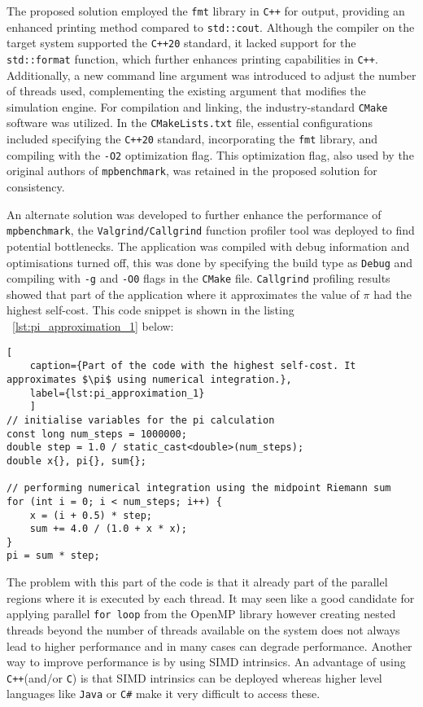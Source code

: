 The proposed solution employed the \texttt{fmt} library in \texttt{C++}\cite{fmt_printing_library} for output, providing an enhanced printing method compared to \texttt{std::cout}. Although the compiler on the target system supported the \texttt{C++20} standard, it lacked support for the \texttt{std::format} function, which further enhances printing capabilities in \texttt{C++}\cite{std_format_gcc_compiler_version}. Additionally, a new command line argument was introduced to adjust the number of threads used, complementing the existing argument that modifies the simulation engine. For compilation and linking, the industry-standard \texttt{CMake}\cite{cmake_about} software was utilized. In the \texttt{CMakeLists.txt} file, essential configurations included specifying the \texttt{C++20} standard, incorporating the \texttt{fmt} library, and compiling with the \texttt{-O2} optimization flag. This optimization flag, also used by the original authors of \texttt{mpbenchmark}\cite{mpbenchmark_paper}, was retained in the proposed solution for consistency.

An alternate solution was developed to further enhance the performance of \texttt{mpbenchmark}, the \texttt{Valgrind/Callgrind} function profiler tool was deployed to find potential bottlenecks. The application was compiled with debug information and optimisations turned off, this was done by specifying the build type as \texttt{Debug} and compiling with \texttt{-g} and \texttt{-O0} flags in the \texttt{CMake} file. \texttt{Callgrind} profiling results showed that part of the application where it approximates the value of $\pi$ had the highest self-cost. This code snippet is shown in the listing ~\ref{lst:pi_approximation_1} below:

\begin{lstlisting}[
	caption={Part of the code with the highest self-cost. It approximates $\pi$ using numerical integration.},
	label={lst:pi_approximation_1}
	]
// initialise variables for the pi calculation
const long num_steps = 1000000;
double step = 1.0 / static_cast<double>(num_steps);
double x{}, pi{}, sum{};

// performing numerical integration using the midpoint Riemann sum
for (int i = 0; i < num_steps; i++) {
	x = (i + 0.5) * step;
	sum += 4.0 / (1.0 + x * x);
}
pi = sum * step;
\end{lstlisting}

The problem with this part of the code is that it already part of the parallel regions where it is executed by each thread. It may seen like a good candidate for applying parallel \texttt{for loop} from the OpenMP library however creating nested threads beyond the number of threads available on the system does not always lead to higher performance and in many cases can degrade performance. Another way to improve performance is by using SIMD intrinsics. An advantage of using \texttt{C++}(and/or \texttt{C}) is that SIMD intrinsics can be deployed whereas higher level languages like \texttt{Java} or \texttt{C\#} make it very difficult to access these. 

